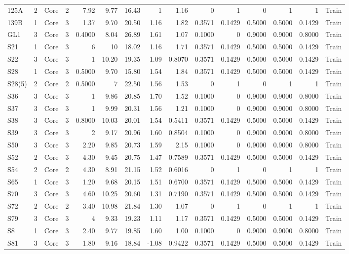 \begin{table}[htbp]
{\begin{tabular}{lrrrrrrrrrrrrrr}
    125A & 2 & Core & 2 & 7.92 & 9.77 & 16.43 & 1 & 1.16 & 0 & 1 & 0 & 1 & 1 & Train \\
    139B & 1 & Core & 3 & 1.37 & 9.70 & 20.50 & 1.16 & 1.82 & 0.3571 & 0.1429 & 0.5000 & 0.5000 & 0.1429 & Train \\
    GL1 & 3 & Core & 3 & 0.4000 & 8.04 & 26.89 & 1.61 & 1.07 & 0.1000 & 0 & 0.9000 & 0.9000 & 0.8000 & Train \\
    S21 & 1 & Core & 3 & 6 & 10 & 18.02 & 1.16 & 1.71 & 0.3571 & 0.1429 & 0.5000 & 0.5000 & 0.1429 & Train \\
    S22 & 3 & Core & 3 & 1 & 10.20 & 19.35 & 1.09 & 0.8070 & 0.3571 & 0.1429 & 0.5000 & 0.5000 & 0.1429 & Train \\
    S28 & 1 & Core & 3 & 0.5000 & 9.70 & 15.80 & 1.54 & 1.84 & 0.3571 & 0.1429 & 0.5000 & 0.5000 & 0.1429 & Train \\
    S28(5) & 2 & Core & 2 & 0.5000 & 7 & 22.50 & 1.56 & 1.53 & 0 & 1 & 0 & 1 & 1 & Train \\
    S36 & 3 & Core & 3 & 1 & 9.86 & 20.85 & 1.70 & 1.52 & 0.1000 & 0 & 0.9000 & 0.9000 & 0.8000 & Train \\
    S37 & 3 & Core & 3 & 1 & 9.99 & 20.31 & 1.56 & 1.21 & 0.1000 & 0 & 0.9000 & 0.9000 & 0.8000 & Train \\
    S38 & 3 & Core & 3 & 0.8000 & 10.03 & 20.01 & 1.54 & 0.5411 & 0.3571 & 0.1429 & 0.5000 & 0.5000 & 0.1429 & Train \\
    S39 & 3 & Core & 3 & 2 & 9.17 & 20.96 & 1.60 & 0.8504 & 0.1000 & 0 & 0.9000 & 0.9000 & 0.8000 & Train \\
    S50 & 3 & Core & 3 & 2.20 & 9.85 & 20.73 & 1.59 & 2.15 & 0.1000 & 0 & 0.9000 & 0.9000 & 0.8000 & Train \\
    S52 & 2 & Core & 3 & 4.30 & 9.45 & 20.75 & 1.47 & 0.7589 & 0.3571 & 0.1429 & 0.5000 & 0.5000 & 0.1429 & Train \\
    S54 & 2 & Core & 2 & 4.30 & 8.91 & 21.15 & 1.52 & 0.6016 & 0 & 1 & 0 & 1 & 1 & Train \\
    S65 & 1 & Core & 3 & 1.20 & 9.68 & 20.15 & 1.51 & 0.6700 & 0.3571 & 0.1429 & 0.5000 & 0.5000 & 0.1429 & Train \\
    S70 & 3 & Core & 3 & 4.60 & 10.25 & 20.60 & 1.31 & 0.7190 & 0.3571 & 0.1429 & 0.5000 & 0.5000 & 0.1429 & Train \\
    S72 & 2 & Core & 2 & 3.40 & 10.98 & 21.84 & 1.30 & 1.07 & 0 & 1 & 0 & 1 & 1 & Train \\
    S79 & 3 & Core & 3 & 4 & 9.33 & 19.23 & 1.11 & 1.17 & 0.3571 & 0.1429 & 0.5000 & 0.5000 & 0.1429 & Train \\
    S8 & 1 & Core & 3 & 2.40 & 9.77 & 19.85 & 1.60 & 1.00 & 0.1000 & 0 & 0.9000 & 0.9000 & 0.8000 & Train \\
    S81 & 3 & Core & 3 & 1.80 & 9.16 & 18.84 & -1.08 & 0.9422 & 0.3571 & 0.1429 & 0.5000 & 0.5000 & 0.1429 & Train \\
    \bottomrule
  \end{tabular}
  }
\end{table}
